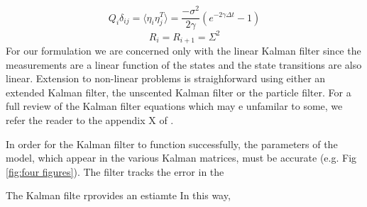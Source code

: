 \documentclass[fleqn,usenatbib,useAMS]{mnras}
\begin{document}
\begin{equation}
	Q_i  \delta_{ij}= \langle \eta_i \eta_j^T \rangle = \frac{- \sigma^2}{2 \gamma} \left( e^{-2 \gamma \Delta t} -1\right)
\end{equation}
\begin{equation}
	R_i = R_{i+1} = \Sigma^2
\end{equation}
For our formulation we are concerned only with the linear Kalman filter since the measurements are a linear function of the states and the state transitions are also linear. Extension to non-linear problems is straighforward using either an extended Kalman filter, the unscented Kalman filter or the particle filter. For a full review of the  Kalman filter equations which may e unfamilar to some, we refer the reader to the appendix X of \cite{Melatos2023}. \newline 



\noindent In order for the Kalman filter to function successfully, the parameters of the model, which appear in the various Kalman matrices, must be accurate (e.g. Fig \ref{fig:four figures}). The filter tracks the error in the




The Kalman filte rprovides an estiamte In this way, 
\end{document}
